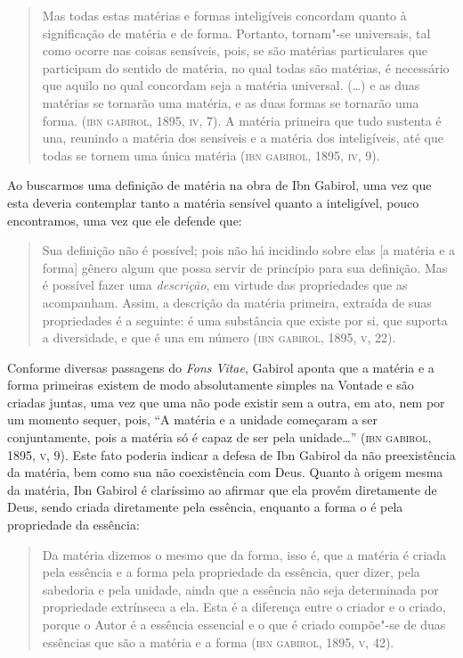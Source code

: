 \begin{quote}
Mas todas estas matérias e formas inteligíveis concordam quanto à
significação de matéria e de forma. Portanto, tornam"-se universais,
tal como ocorre nas coisas sensíveis, pois, se são matérias
particulares que participam do sentido de matéria, no qual todas são
matérias, é necessário que aquilo no qual concordam seja a matéria
universal. (\ldots{}) e as duas matérias se tornarão uma matéria, e as
duas formas se tornarão uma forma. (\textsc{ibn} \textsc{gabirol},
1895, \textsc{iv}, 7). A
matéria primeira que tudo sustenta é una, reunindo a matéria dos
sensíveis e a matéria dos inteligíveis, até que todas se tornem uma
única matéria (\textsc{ibn} \textsc{gabirol}, 1895, \textsc{iv}, 9).
\end{quote}

Ao buscarmos uma definição de matéria na obra de Ibn Gabirol, uma vez
que esta deveria contemplar tanto a matéria sensível quanto a
inteligível, pouco encontramos, uma vez que ele defende que:

\begin{quote}
Sua definição não é possível; pois não há incidindo sobre elas [a
matéria e a forma] gênero algum que possa servir de princípio para
sua definição. Mas é possível fazer uma \emph{descrição}, em
virtude das propriedades que as acompanham. Assim, a descrição da
matéria primeira, extraída de suas propriedades é a seguinte: é uma
substância que existe por si, que suporta a diversidade, e que é una
em número (\textsc{ibn} \textsc{gabirol}, 1895, \textsc{v}, 22).
\end{quote}

Conforme diversas passagens do \emph{Fons Vitae}, Gabirol aponta que
a matéria e a forma primeiras existem de modo absolutamente simples
na Vontade e são criadas juntas, uma vez que uma não pode existir sem
a outra, em ato, nem por um momento sequer, pois, “A matéria e a
unidade começaram a ser conjuntamente, pois a matéria só é capaz de
ser pela unidade\ldots{}” (\textsc{ibn} \textsc{gabirol}, 1895, \textsc{v}, 9). Este fato poderia
indicar a defesa de Ibn Gabirol da não preexistência da matéria, bem
como sua não coexistência com Deus. Quanto à origem mesma da matéria,
Ibn Gabirol é claríssimo ao afirmar que ela provém diretamente de
Deus, sendo criada diretamente pela essência, enquanto a forma o é
pela propriedade da essência:

\begin{quote}
Da matéria dizemos o mesmo que da forma, isso é, que a matéria é
criada pela essência e a forma pela propriedade da essência, quer
dizer, pela sabedoria e pela unidade, ainda que a essência não seja
determinada por propriedade extrínseca a ela. Esta é a diferença
entre o criador e o criado, porque o Autor é a essência essencial e o
que é criado compõe"-se de duas essências que são a matéria e a forma
(\textsc{ibn} \textsc{gabirol}, 1895, \textsc{v}, 42).
\end{quote}

